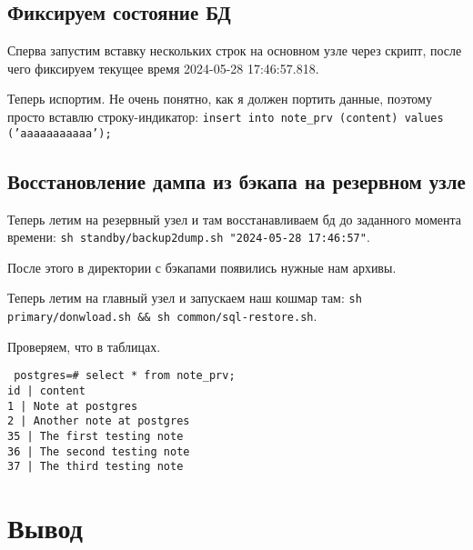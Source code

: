 \documentclass{article}
\begin{document}
\subsection{Фиксируем состояние БД}

Сперва запустим вставку нескольких строк на основном узле через скрипт, после чего фиксируем текущее время 2024-05-28 17:46:57.818.



Теперь испортим. Не очень понятно, как я должен портить данные, поэтому просто вставлю строку-индикатор: \texttt{insert into note\_prv (content) values ('aaaaaaaaaaa');
}

\subsection{Восстановление дампа из бэкапа на резервном узле}

Теперь летим на резервный узел и там восстанавливаем бд до заданного момента времени: \texttt{sh standby/backup2dump.sh "2024-05-28 17:46:57"}.





После этого в директории с бэкапами появились нужные нам архивы.

Теперь летим на главный узел и запускаем наш кошмар там: \texttt{sh primary/donwload.sh \&\& sh common/sql-restore.sh}.



Проверяем, что в таблицах.

\texttt{
    postgres=\# select * from note\_prv;\\
    id |         content          \\
    1 | Note at postgres\\
    2 | Another note at postgres\\
    35 | The first testing note\\
    36 | The second testing note\\
    37 | The third testing note
}

\section{Вывод}
\end{document}
